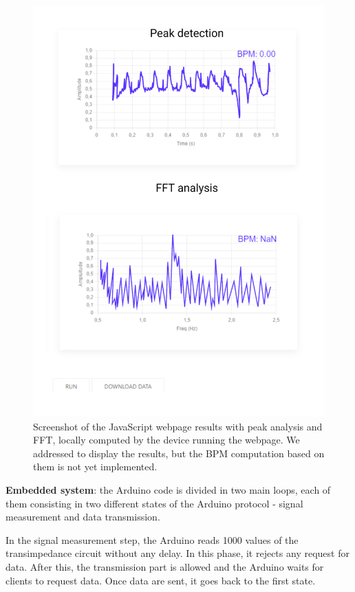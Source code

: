 \documentclass[conference]{IEEEtran}
\begin{document}
      \begin{figure}[t]
         \centering
         \includegraphics[width=\linewidth]{images/mockupweb.png}
         \caption{Screenshot of the JavaScript webpage results with peak analysis and FFT, locally computed by the device running the webpage. We addressed to display the results, but the BPM computation based on them is not yet implemented.}
         \label{fig:webpage}
      \end{figure}

      \textbf{Embedded system}: the Arduino code is divided in two main loops, each of them consisting in two different states of the Arduino protocol - signal measurement and data transmission. 
      
      In the signal measurement step, the Arduino reads 1000 values of the transimpedance circuit without any delay. In this phase, it rejects any request for data. After this, the transmission part is allowed and the Arduino waits for clients to request data. Once data are sent, it goes back to the first state.
      
\end{document}
